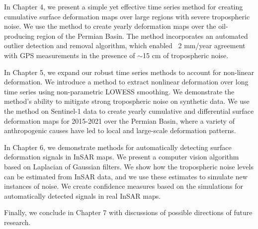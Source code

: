 In Chapter 4, we present a simple yet effective time series method for creating cumulative surface deformation maps over large regions with severe tropospheric noise. We use the method to create yearly deformation maps over the oil-producing region of the Permian Basin. The method incorporates an automated outlier detection and removal algorithm, which enabled ~2 mm/year agreement with GPS measurements in the presence of $\sim$15 cm of tropospheric noise.


In Chapter 5, we expand our robust time series methods to account for non-linear deformation. We introduce a method to extract nonlinear deformation over long time series using non-parametric LOWESS smoothing. We demonstrate the method's ability to mitigate strong tropospheric noise on synthetic data. We use the method on Sentinel-1 data to create yearly cumulative and differential surface deformation maps for 2015-2021 over the Permian Basin, where a variety of anthropogenic causes have led to local and large-scale deformation patterns.


In Chapter 6, we demonstrate methods for automatically detecting surface deformation signals in InSAR maps. We present a computer vision algorithm based on Laplacian of Gaussian filters. We show how the tropospheric noise levels can be estimated from InSAR data, and we use these estimates to simulate new instances of noise. We create confidence measures based on the simulations for automatically detected signals in real InSAR maps.


Finally, we conclude in Chapter 7 with discussions of possible directions of future research.
